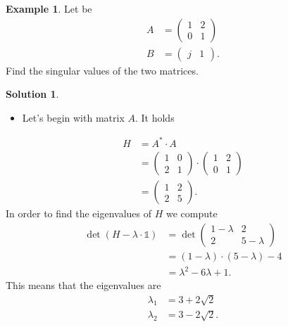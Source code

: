 \documentclass[a4paper,12 pt]{article}
\numberwithin{equation}{section}
\theoremstyle{definition}
\newtheorem{bsp}{Example}
\theoremstyle{remark}
\theoremstyle{definition}
\newtheorem*{lsg}{Solution}
\theoremstyle{definition}
\theoremstyle{definition}
\theoremstyle{remark}
\begin{document}
\begin{bsp}
Let be
\begin{equation*}
\begin{split}
A&=\begin{pmatrix}
1&2\\
0&1
\end{pmatrix}\\
B&=\begin{pmatrix}
j&1
\end{pmatrix}.
\end{split}
\end{equation*}
Find the singular values of the two matrices.
\newpage
\begin{lsg}
\
\begin{itemize}
\item Let's begin with matrix $A$. It holds
\end{itemize}
\begin{equation*}
\begin{split}
H&=A^*\cdot A\\
&=\begin{pmatrix}
1&0\\
2&1
\end{pmatrix}\cdot \begin{pmatrix}
1&2\\
0&1
\end{pmatrix}\\
&=\begin{pmatrix}
1&2\\
2&5
\end{pmatrix}.
\end{split}
\end{equation*}
In order to find the eigenvalues of $H$ we compute
\begin{equation*}
\begin{split}
\det(H-\lambda \cdot \mathbb{1})&=\det \begin{pmatrix}
 1-\lambda &2\\
2&5-\lambda
\end{pmatrix}\\
&=(1-\lambda)\cdot (5-\lambda)-4\\
&=\lambda^2-6\lambda +1.
\end{split}
\end{equation*}
This means that the eigenvalues are
\begin{equation*}
\begin{split}
\lambda_1 &=3+ 2\sqrt{2}\\
\lambda_2 &=3- 2\sqrt{2}.
\end{split}

\end{equation*}
\end{lsg}
\end{bsp}
\end{document}
